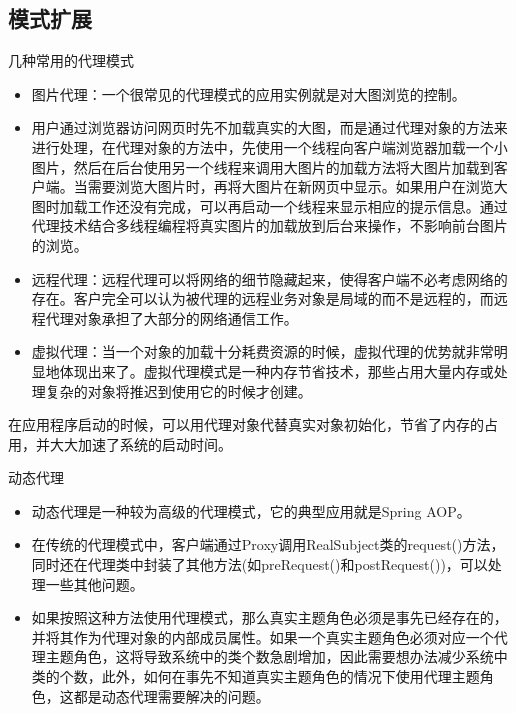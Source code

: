 \documentclass[letterpaper,10pt,english]{sphinxmanual}
\begin{document}
\subsection{模式扩展}
\label{\detokenize{structural_patterns/proxy:id14}}
\sphinxAtStartPar
几种常用的代理模式
\begin{itemize}
\item {} 
\sphinxAtStartPar
图片代理：一个很常见的代理模式的应用实例就是对大图浏览的控制。

\item {} 
\sphinxAtStartPar
用户通过浏览器访问网页时先不加载真实的大图，而是通过代理对象的方法来进行处理，在代理对象的方法中，先使用一个线程向客户端浏览器加载一个小图片，然后在后台使用另一个线程来调用大图片的加载方法将大图片加载到客户端。当需要浏览大图片时，再将大图片在新网页中显示。如果用户在浏览大图时加载工作还没有完成，可以再启动一个线程来显示相应的提示信息。通过代理技术结合多线程编程将真实图片的加载放到后台来操作，不影响前台图片的浏览。

\item {} 
\sphinxAtStartPar
远程代理：远程代理可以将网络的细节隐藏起来，使得客户端不必考虑网络的存在。客户完全可以认为被代理的远程业务对象是局域的而不是远程的，而远程代理对象承担了大部分的网络通信工作。

\item {} 
\sphinxAtStartPar
虚拟代理：当一个对象的加载十分耗费资源的时候，虚拟代理的优势就非常明显地体现出来了。虚拟代理模式是一种内存节省技术，那些占用大量内存或处理复杂的对象将推迟到使用它的时候才创建。

\end{itemize}

\sphinxAtStartPar
\sphinxhyphen{}在应用程序启动的时候，可以用代理对象代替真实对象初始化，节省了内存的占用，并大大加速了系统的启动时间。

\sphinxAtStartPar
动态代理
\begin{itemize}
\item {} 
\sphinxAtStartPar
动态代理是一种较为高级的代理模式，它的典型应用就是Spring AOP。

\item {} 
\sphinxAtStartPar
在传统的代理模式中，客户端通过Proxy调用RealSubject类的request()方法，同时还在代理类中封装了其他方法(如preRequest()和postRequest())，可以处理一些其他问题。

\item {} 
\sphinxAtStartPar
如果按照这种方法使用代理模式，那么真实主题角色必须是事先已经存在的，并将其作为代理对象的内部成员属性。如果一个真实主题角色必须对应一个代理主题角色，这将导致系统中的类个数急剧增加，因此需要想办法减少系统中类的个数，此外，如何在事先不知道真实主题角色的情况下使用代理主题角色，这都是动态代理需要解决的问题。

\end{itemize}
\end{document}
